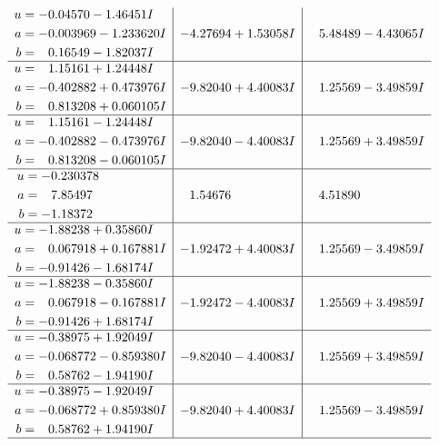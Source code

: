 \documentclass[1p]{elsarticle_modified}
\theoremstyle{definition}
\begin{document}
$$\begin{array}{c|c|c}
\begin{aligned}
u &= -0.04570 - 1.46451 I \\
a &= -0.003969 - 1.233620 I \\
b &= \phantom{-}0.16549 - 1.82037 I\end{aligned}
 & -4.27694 + 1.53058 I & \phantom{-}5.48489 - 4.43065 I \\ \hline\begin{aligned}
u &= \phantom{-}1.15161 + 1.24448 I \\
a &= -0.402882 + 0.473976 I \\
b &= \phantom{-}0.813208 + 0.060105 I\end{aligned}
 & -9.82040 + 4.40083 I & \phantom{-}1.25569 - 3.49859 I \\ \hline\begin{aligned}
u &= \phantom{-}1.15161 - 1.24448 I \\
a &= -0.402882 - 0.473976 I \\
b &= \phantom{-}0.813208 - 0.060105 I\end{aligned}
 & -9.82040 - 4.40083 I & \phantom{-}1.25569 + 3.49859 I \\ \hline\begin{aligned}
u &= -0.230378\phantom{ +0.000000I} \\
a &= \phantom{-}7.85497\phantom{ +0.000000I} \\
b &= -1.18372\phantom{ +0.000000I}\end{aligned}
 & \phantom{-}1.54676\phantom{ +0.000000I} & \phantom{-}4.51890\phantom{ +0.000000I} \\ \hline\begin{aligned}
u &= -1.88238 + 0.35860 I \\
a &= \phantom{-}0.067918 + 0.167881 I \\
b &= -0.91426 - 1.68174 I\end{aligned}
 & -1.92472 + 4.40083 I & \phantom{-}1.25569 - 3.49859 I \\ \hline\begin{aligned}
u &= -1.88238 - 0.35860 I \\
a &= \phantom{-}0.067918 - 0.167881 I \\
b &= -0.91426 + 1.68174 I\end{aligned}
 & -1.92472 - 4.40083 I & \phantom{-}1.25569 + 3.49859 I \\ \hline\begin{aligned}
u &= -0.38975 + 1.92049 I \\
a &= -0.068772 - 0.859380 I \\
b &= \phantom{-}0.58762 - 1.94190 I\end{aligned}
 & -9.82040 - 4.40083 I & \phantom{-}1.25569 + 3.49859 I \\ \hline\begin{aligned}
u &= -0.38975 - 1.92049 I \\
a &= -0.068772 + 0.859380 I \\
b &= \phantom{-}0.58762 + 1.94190 I\end{aligned}
 & -9.82040 + 4.40083 I & \phantom{-}1.25569 - 3.49859 I\\
 \hline 
 \end{array}$$\newpage\newpage\renewcommand{\arraystretch}{1}
\end{document}
